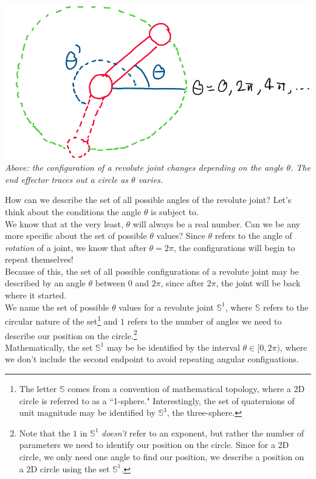 \documentclass[oneside]{book}
\begin{document}
\begin{center}
    \includegraphics[scale=0.3]{images/s1.png}\\
    \textit{Above: the configuration of a revolute joint changes depending on the angle $\theta$. The end effector traces out a circle as $\theta$ varies.}
\end{center}
How can we describe the set of all possible angles of the revolute joint? Let's think about the conditions the angle $\theta$ is subject to. \\
We know that at the very least, $\theta$ will always be a real number. Can we be any more specific about the set of possible $\theta$ values? Since $\theta$ refers to the angle of \textit{rotation} of a joint, we know that after $\theta = 2\pi$, the configurations will begin to repeat themselves!\\
Because of this, the set of all possible configurations of a revolute joint may be described by an angle $\theta$ between 0 and $2\pi$, since after $2\pi$, the joint will be back where it started.\\
We name the set of possible $\theta$ values for a revolute joint $\mathbb{S}^1$, where $\mathbb{S}$ refers to the circular nature of the set\footnote{The letter $\mathbb{S}$ comes from a convention of mathematical topology, where a 2D circle is referred to as a ``1-sphere." Interestingly, the set of quaternions of unit magnitude may be identified by $\mathbb{S}^3$, the three-sphere.} and $1$ refers to the number of angles we need to describe our position on the circle.\footnote{Note that the $1$ in $\mathbb{S}^1$ \textit{doesn't} refer to an exponent, but rather the number of parameters we need to identify our position on the circle. Since for a 2D circle, we only need one angle to find our position, we describe a position on a 2D circle using the set $\mathbb{S}^1$.}\\
Mathematically, the set $\mathbb{S}^1$ may be be identified by the interval $\theta \in [0, 2\pi)$, where we don't include the second endpoint to avoid repeating angular configuations.\\
\end{document}
